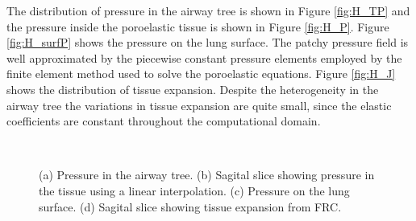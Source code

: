 %
The distribution of pressure in the airway tree is shown in Figure \ref{fig:H_TP} and the pressure inside the poroelastic tissue is shown in Figure \ref{fig:H_P}.  Figure \ref{fig:H_surfP} shows the pressure on the lung surface. The patchy pressure field is well approximated by the piecewise constant pressure elements employed by the finite element method used to solve the poroelastic equations. Figure \ref{fig:H_J} shows the distribution of tissue expansion. Despite the heterogeneity in the airway tree the variations in tissue expansion are quite small, since the elastic coefficients are constant throughout the computational domain.
%
\begin{figure}[h]
  \centering
  \\
  \label{fig:acinar_units}
\caption{(a) Pressure in the airway tree. (b) Sagital slice showing pressure in the tissue using a linear interpolation. (c) Pressure on the lung surface.  (d) Sagital slice showing tissue expansion from FRC.}
\end{figure}
%


